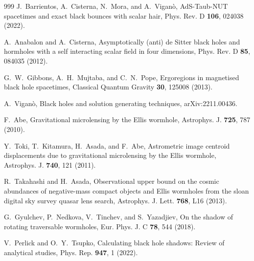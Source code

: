 \documentclass[aps,preprint,groupedaddress,nofootinbib,superscriptaddress,showkeys,showpacs,eqsecnum,amsmath,amssymb]{revtex4-1}
\begin{document}
\begin{thebibliography}{999}
J.~Barrientos, A.~Cisterna, N.~Mora, and A.~Vigan\`o,
AdS-Taub-NUT spacetimes and exact black bounces with scalar hair,
Phys. Rev. D \textbf{106}, 024038 (2022).

A.~Anabalon and A.~Cisterna,
Asymptotically (anti) de Sitter black holes and hormholes with a self interacting scalar field in four dimensions,
Phys. Rev. D \textbf{85}, 084035 (2012).

G.~W.~Gibbons, A.~H.~Mujtaba, and C.~N.~Pope,
Ergoregions in magnetised black hole spacetimes,
Classical Quantum Gravity \textbf{30}, 125008 (2013).





A.~Vigan\`o,
Black holes and solution generating techniques, arXiv:2211.00436.




F.~Abe,
Gravitational microlensing by the Ellis wormhole,
Astrophys. J. \textbf{725}, 787 (2010).


Y.~Toki, T.~Kitamura, H.~Asada, and F.~Abe,
Astrometric image centroid displacements due to gravitational microlensing by the Ellis wormhole,
Astrophys. J. \textbf{740}, 121 (2011).

R.~Takahashi and H.~Asada,
Observational upper bound on the cosmic abundances of negative-mass compact objects and Ellis wormholes from the sloan digital sky survey quasar lens search,
Astrophys. J. Lett. \textbf{768}, L16 (2013).


G.~Gyulchev, P.~Nedkova, V.~Tinchev, and S.~Yazadjiev,
On the shadow of rotating traversable wormholes,
Eur. Phys. J. C \textbf{78}, 544 (2018).



V.~Perlick and O.~Y.~Tsupko,
Calculating black hole shadows: Review of analytical studies,
Phys. Rep. \textbf{947}, 1 (2022).







\end{thebibliography}
\end{document}

